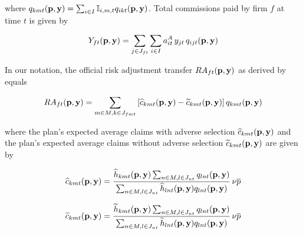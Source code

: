 \documentclass[12pt]{article}
\begin{document}
\noindent where $q_{kmt}({\bf p},{\bf y}) = \sum_{i \in I} \mathbb{I}_{i,m,t} q_{ikt}({\bf p},{\bf y})$.  Total commissions paid by firm $f$ at time $t$ is given by

\begin{equation*}
    Y_{ft}({\bf p},{\bf y}) = \sum_{j \in J_{ft}} \sum_{i \in I} a_{it}^A \, y_{jt}  \, q_{ijt}({\bf p},{\bf y}) 
\end{equation*}

\noindent In our notation, the official risk adjustment transfer  $RA_{ft}({\bf p},{\bf y})$ as derived by \citet{pope2014} equals
	
	
	
		\begin{equation*}\label{ra_formula}
			RA_{ft}({\bf p},{\bf y}) = \sum_{m \in M, k \in J_{fmt}} \left[\widehat{c}_{kmt}({\bf p},{\bf y}) - \widetilde{c}_{kmt}({\bf p},{\bf y})\right] q_{kmt}({\bf p},{\bf y}) 
		\end{equation*}
		

	
	
	\noindent where the plan's expected average claims with adverse selection $\widehat{c}_{kmt}({\bf p},{\bf y})$ and the plan's expected average claims without adverse selection $\widetilde{c}_{kmt}({\bf p},{\bf y})$ are given by 
    
        \begin{equation*}
            \widehat{c}_{kmt}({\bf p},{\bf y}) = \frac{\widehat{h}_{kmt}({\bf p},{\bf y}) \sum_{n \in M,l \in J_{nt}} q_{lnt}({\bf p},{\bf y})}{\sum_{n \in M,l \in J_{nt}} \widehat{h}_{lnt}({\bf p},{\bf y})q_{lnt}({\bf p},{\bf y})} \, \nu\overline{p}
        \end{equation*}

        \begin{equation*}
            \widetilde{c}_{kmt}({\bf p},{\bf y}) = \frac{\widetilde{h}_{kmt}({\bf p},{\bf y}) \sum_{n \in M,l \in J_{nt}} q_{lnt}({\bf p},{\bf y})}{\sum_{n \in M, l \in J_{nt}} \widetilde{h}_{lnt}({\bf p},{\bf y})q_{lnt}({\bf p},{\bf y})} \, \nu\overline{p}
        \end{equation*}
    
\end{document}
